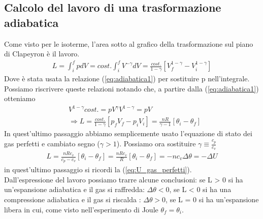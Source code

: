 \documentclass[
10pt, %
a4paper, %
oneside, %
headinclude,footinclude, %
BCOR5mm, %
]{scrartcl}
\begin{document}
\subsection{Calcolo del lavoro di una trasformazione adiabatica}
Come visto per le isoterme, l'area sotto al grafico della trasformazione sul piano di Clapeyron è il lavoro. 
\begin{align*}
	L = \int_{i}^{f} p dV = cost. \int_{i}^{f} V^{-\gamma} dV = \frac{cost.}{1 - \gamma}[V_f^{1-\gamma}-V_i^{1-\gamma}]
\end{align*}
Dove è stata usata la relazione (\ref{eq:adiabatica1}) per sostituire p nell'integrale.\\
Possiamo riscrivere queste relazioni notando che, a partire dalla (\ref{eq:adiabatica1}) otteniamo
\begin{align*}
	&V^{1- \gamma} cost. = pV^{\gamma} V^{1- \gamma} = pV\\
	&\Rightarrow L =  \frac{cost.}{1 - \gamma}[p_f V_f-p_i V_i] = \frac{n R}{\gamma - 1}[\theta_i - \theta_f]
\end{align*}
In quest'ultimo passaggio abbiamo semplicemente usato l'equazione di stato dei gas perfetti e cambiato segno ($\gamma > 1$). Possiamo ora sostituire $\gamma \equiv \frac{c_p}{c_v}$ 
\begin{align*}
	L = \frac{n R c_v}{c_p - c_v} [\theta_i - \theta_f] = \frac{n R c_v}{R} [\theta_i - \theta_f] = -n c_v \Delta \theta = -\Delta U
\end{align*}
in quest'ultimo passaggio si ricordi la (\ref{eq:U_gas_perfetti}).\\
Dall'espressione del lavoro possiamo trarre alcune conclusioni: se L > 0 si ha un'espansione adiabatica e il gas si raffredda: \(\Delta \theta< 0\), se L < 0 si ha una compressione adiabatica e il gas si riscalda : \(\Delta \theta > 0\), se L = 0 si ha un'espansione libera in cui, come visto nell'esperimento di Joule \(\theta_f = \theta_i\).
\end{document}
